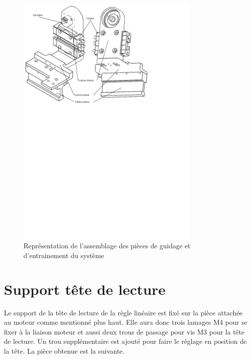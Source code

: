 \begin{figure}[H]
  \centering
  \includegraphics[width = 0.8\textwidth]{assets/figures/AssemblageGuidageEntrainement.svg}
  \caption{Représentation de l'assemblage des pièces de guidage et d'entrainement du système}
  \label{fig:AssGuiEntr}
\end{figure}

\section{Support tête de lecture}\label{sec:SupTeteLect}
Le support de la tête de lecture de la règle linéaire est fixé sur la pièce attachée au moteur comme mentionné plus haut. Elle aura donc trois
lamages M4 pour se fixer à la liaison moteur et aussi deux trous de passage pour vis M3 pour la tête de lecture. Un trou supplémentaire est ajouté
pour faire le réglage en position de la tête. La pièce obtenue est la suivante.

